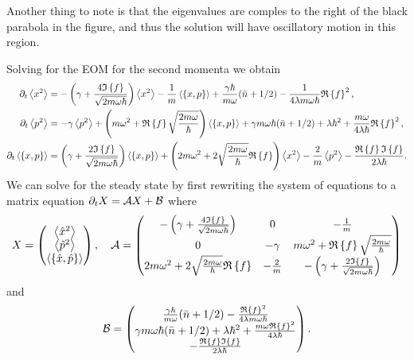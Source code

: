 Another thing to note is that the eigenvalues are comples to the right of the black parabola in the figure, and thus the solution will have oscillatory motion in this region.

Solving for the EOM for the second momenta we obtain
\begin{align}
    \dt \expval{x^2} &= -\left(\gamma + \frac{4\im{f}}{\sqrt{2 m \omega \hbar}}\right) \expval{x^2} - \frac{1}{m} \expval{\acomm{x}{p}} + \frac{\gamma \hbar}{m \omega} (\nbar + 1/2) - \frac{1}{4\lambda m \omega \hbar} \re{f}^2,\\
    \dt \expval{p^2} &=  -\gamma \expval{p^2} + \left( m\omega^2 + \re{f} \sqrt{\frac{2m \omega}{\hbar}} \right)\expval{\acomm{x}{p}} + \gamma m \omega \hbar (\nbar + 1/2) + \lambda \hbar^2 + \frac{m \omega}{4 \lambda \hbar}\re{f}^2 ,\\
    \dt \expval{\acomm{x}{p}} &= \left(\gamma + \frac{2\im{f}}{\sqrt{2m \omega \hbar}}  \right)\expval{\acomm{x}{p}} + \left(2 m \omega^2 + 2 \sqrt{\frac{2 m \omega}{\hbar}}\re{f} \right) \expval{x^2} - \frac{2}{m} \expval{p^2} - \frac{\re{f} \im{f}}{2 \lambda \hbar}.
\end{align}
We can solve for the steady state by first rewriting the system of equations to a matrix equation $\partial_t X = \mathcal{A} X + \mathcal{B}$ where
\begin{equation}
    X =
    \begin{pmatrix}
        \expval{\xop^2}\\
        \expval{\pop^2}\\
        \expval{\acomm{\xop}{\pop}}    
    \end{pmatrix}, \quad
    \mathcal{A} = \begin{pmatrix}
        -\left(\gamma + \frac{4\im{f}}{\sqrt{2 m \omega \hbar}}\right) & 0 & -\frac{1}{m} \\
        0 & -\gamma & m\omega^2 + \re{f} \sqrt{\frac{2m \omega}{\hbar}} \\
        2 m \omega^2 + 2 \sqrt{\frac{2 m \omega}{\hbar}}\re{f} & -\frac{2}{m} & -\left(\gamma +\frac{2\im{f}}{\sqrt{2m \omega \hbar}}\right) \label{eq:matrixA}
    \end{pmatrix}
\end{equation}
and
\begin{equation}
    \mathcal{B} = 
    \begin{pmatrix}
        \frac{\gamma \hbar}{m \omega} (\bar{n} + 1/2) - \frac{\mathfrak{R}\left\{f\right\}^2}{4\lambda m \omega \hbar}\\
        \gamma m \omega \hbar (\bar{n} + 1/2) + \lambda \hbar^2 +\frac{m \omega \mathfrak{R}\left\{f\right\}^2}{4 \lambda \hbar}\\
        -\frac{\mathfrak{R}\left\{f\right\} \mathfrak{I}\left\{f\right\}}{2 \lambda \hbar}
    \end{pmatrix}.
\end{equation}
